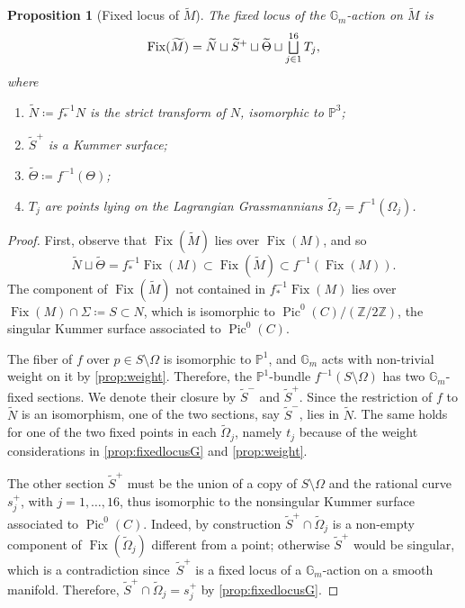 \documentclass[JEP,XML,SOM,Unicode, NoEqCountersInSection,NoFloatCountersInSection,published]{cedram}
\let\oldbigsqcup\bigsqcup
\renewcommand{\bigsqcup}{\mathop{\textstyle\oldbigsqcup}\displaylimits}
\newtheorem{prop}[thm]{Proposition}
\theoremstyle{definition}
\newcommand{\Gm}{\mathbb{G}_m}
\newcommand{\PP}{\mathbb{P}}
\newcommand{\Pic}{\operatorname{Pic}}
\newcommand{\Fix}{\operatorname{Fix}}
\newcommand{\tomega}{\widetilde{\Omega}}
\let\NBun N
\begin{document}
\begin{prop}[Fixed locus of $\widetilde{M}$] \label{prop:fixedlocusMtilde}
The fixed locus of the $\Gm$\nobreakdash-action on $\widetilde{M}$ is
\[
\Fix(\widetilde{M})= \widetilde{\NBun} \sqcup \widetilde{S}^+ \sqcup \widetilde{\Theta} \sqcup \bigsqcup^{16}_{j \in 1} T_j,
\]
where
\begin{enumerate}
\item $\widetilde{\NBun} \coloneqq f^{-1}_*\NBun$ is the strict transform of $\NBun$, isomorphic to $\PP^3$;
\item $\widetilde{S}^+$ is a Kummer surface;
\item $\widetilde{\Theta} \coloneqq f^{-1}(\Theta)$;
\item $T_j$ are points lying on the Lagrangian Grassmannians $\tomega_j = f^{-1}(\Omega_j)$.
\end{enumerate}
\end{prop}
\begin{proof}
First, observe that $\Fix(\widetilde{M})$ lies over $\Fix(M)$, and so
\[
\widetilde{N} \sqcup \widetilde{\Theta} = f^{-1}_*\Fix(M) \subset \Fix(\widetilde{M}) \subset f^{-1} (\Fix(M)).
\]
The component of $\Fix(\widetilde{M})$ not contained in $f^{-1}_*\Fix(M)$ lies over $\Fix(M) \cap \Sigma \coloneqq S \subset \NBun$, which is isomorphic to $\Pic^0(C)/(\mathbb{Z}/2\mathbb{Z})$, \ie the singular Kummer surface associated to $\Pic^0(C)$.

The fiber of $f$ over $p \in S \setminus \Omega$ is isomorphic to $\mathbb{P}^1$, and $\Gm$ acts with non-trivial weight on it by \cref{prop:weight}. Therefore, the $\PP^1$-bundle $f^{-1}(S \setminus \Omega)$ has two $\Gm$\nobreakdash-fixed sections. We denote their closure by $\widetilde{S}^{-}$ and $\widetilde{S}^{+}$. Since the restriction of $f$ to $\widetilde{\NBun}$ is an isomorphism, one of the two sections, say $\widetilde{S}^{-}$, lies in $\widetilde{\NBun}$. The same holds for one of the two fixed points in each $\tomega_j$, namely $t_j$ because of the weight considerations in \cref{prop:fixedlocusG} and \cref{prop:weight}.

The other section $\widetilde{S}^{+}$ must be the union of a copy of $S \setminus \Omega$ and the rational curve~$s^{+}_j$, with $j=1, \ldots, 16$, thus isomorphic to the nonsingular Kummer surface associated to $\Pic^0(C)$. Indeed, by construction $\widetilde{S}^{+} \cap \tomega_j$ is a non-empty component of $\Fix(\tomega_j)$ different from a point; otherwise $\widetilde{S}^{+}$ would be singular, which is a contradiction since~$\widetilde{S}^{+}$ is a fixed locus of a $\Gm$\nobreakdash-action on a smooth manifold. Therefore, $\widetilde{S}^{+} \cap \tomega_j = s^{+}_j$ by \cref{prop:fixedlocusG}.
\end{proof}
\end{document}

